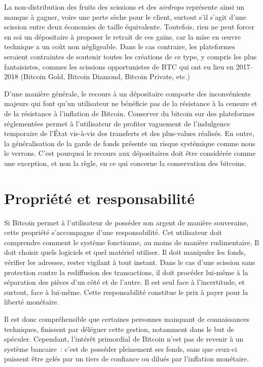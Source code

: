 La non-distribution des fruits des scissions et des \emph{airdrops} représente ainsi un manque à gagner, voire une perte sèche pour le client, surtout s'il s'agit d'une scission entre deux économies de taille équivalente. Toutefois, rien ne peut forcer en soi un dépositaire à proposer le retrait de ces gains, car la mise en œuvre technique a un coût non négligeable. Dans le cas contraire, les plateformes seraient contraintes de soutenir toutes les créations de ce type, y compris les plus fantaisistes, commes les scissions opportunistes de BTC qui ont eu lieu en 2017--2018 (Bitcoin Gold, Bitcoin Diamond, Bitcoin Private, etc.) %

D'une manière générale, le recours à un dépositaire comporte des inconvénients majeurs qui font qu'un utilisateur ne bénéficie pas de la résistance à la censure et de la résistance à l'inflation de Bitcoin. Conserver du bitcoin sur des plateformes réglementées permet à l'utilisateur de profiter vaguement de l'indulgence temporaire de l'État vis-à-vis des transferts et des plus-values réalisés. En outre, la généralisation de la garde de fonds présente un risque systémique comme nous le verrons. C'est pourquoi le recours aux dépositaires doit être considérée comme une exception, et non la règle, en ce qui concerne la conservation des bitcoins.

\section*{Propriété et responsabilité}

Si Bitcoin permet à l'utilisateur de posséder son argent de manière souveraine, cette propriété s'accompagne d'une responsabilité. Cet utilisateur doit comprendre comment le système fonctionne, au moins de manière rudimentaire. Il doit choisir quels logiciels et quel matériel utiliser. Il doit manipuler les fonds, vérifier les adresses, rester vigilant à tout instant. Dans le cas d'une scission sans protection contre la rediffusion des transactions, il doit procéder lui-même à la séparation des pièces d'un côté et de l'autre. Il est seul face à l'incertitude, et surtout, face à lui-même. Cette responsabilité constitue le prix à payer pour la liberté monétaire.

Il est donc compréhensible que certaines personnes manquant de connaissances techniques, finissent par déléguer cette gestion, notamment dans le but de spéculer. Cependant, l'intérêt primordial de Bitcoin n'est pas de revenir à un système bancaire~: c'est de posséder pleinement ses fonds, sans que ceux-ci puissent être gelés par un tiers de confiance ou dilués par l'inflation monétaire. 

